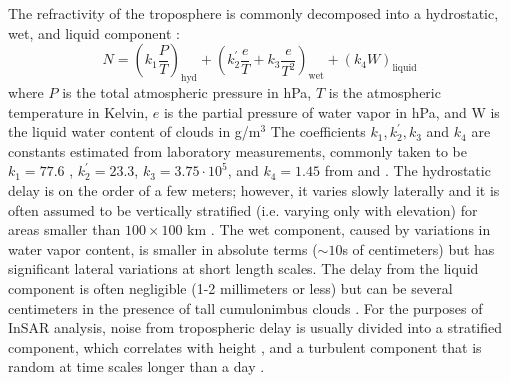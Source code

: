 The refractivity of the troposphere is commonly decomposed into a hydrostatic, wet, and liquid component \citep{Hanssen2001RadarInterferometryData, Bekaert2015StatisticalComparisonInsar}:
\begin{equation}
	N = \left(k_1 \frac{P}{T} \right)_{\text{hyd}} + \left( k_2^{'} \frac{e}{T} + k_3  \frac{e}{T^2}   \right)_{\text{wet}} + \left(k_4 W \right)_{\text{liquid}}
\end{equation}
where $ P $ is the total atmospheric pressure in hPa, $ T $ is the atmospheric temperature in Kelvin,  $ e $ is the partial pressure of water vapor in hPa, and W is the liquid water content of clouds in g/m$^3 $ 
The coefficients $ k_1, k_2^{'}, k_3 $ and $ k_4 $ are constants estimated from laboratory measurements, commonly taken to be $ k_1 = 77.6$ , $ k_2^{'} = 23.3 $, $ k_3= 3.75 \cdot 10^5 $, and $ k_4 = 1.45 $ from \cite{Smith1953ConstantsEquationAtmospheric} and \cite{Solheim1999PropagationDelaysInduced}.
The hydrostatic delay is on the order of a few meters; however, it varies slowly laterally and it is often assumed to be vertically stratified (i.e. varying only with elevation) for areas smaller than $100 \times 100$ km \citep{Doin2009CorrectionsStratifiedTropospheric}.
The wet component, caused by variations in water vapor content, is smaller in absolute terms ($ \sim10$s of centimeters) but has significant lateral variations at short length scales. The delay from the liquid component is often negligible (1-2 millimeters or less) but can be several centimeters in the presence of tall cumulonimbus clouds \citep{Liu2012SatelliteRadarInterferometry}.
For the purposes of InSAR analysis, noise from tropospheric delay is usually divided into a stratified component, which correlates with height \citep{Hanssen2001RadarInterferometryData, Doin2009CorrectionsStratifiedTropospheric}, and a turbulent component that is random at time scales longer than a day \citep{Emardson2003NeutralAtmosphericDelay, Onn2006ModelingWaterVapor}. 

